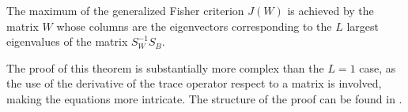 \begin{theorem}
The maximum of the generalized Fisher criterion $J(W)$ is achieved by the matrix $W$ whose columns are the eigenvectors corresponding to the $L$ largest eigenvalues of the matrix $S_W^{-1} S_B$.
\end{theorem}

The proof of this theorem is substantially more complex than the $L=1$ case, as the use of the derivative of the trace operator respect to a matrix is involved, making the equations more intricate. The structure of the proof can be found in \cite{fukunaga1990introduction}.
